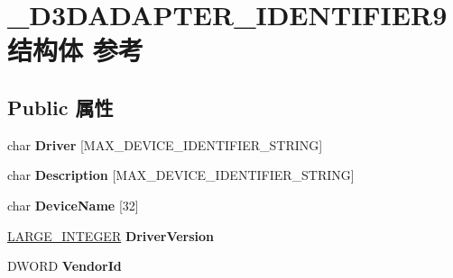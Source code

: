 \hypertarget{struct___d3_d_a_d_a_p_t_e_r___i_d_e_n_t_i_f_i_e_r9}{}\section{\+\_\+\+D3\+D\+A\+D\+A\+P\+T\+E\+R\+\_\+\+I\+D\+E\+N\+T\+I\+F\+I\+E\+R9结构体 参考}
\label{struct___d3_d_a_d_a_p_t_e_r___i_d_e_n_t_i_f_i_e_r9}
\subsection*{Public 属性}
\begin{DoxyCompactItemize}
\item 
\mbox{\label{struct___d3_d_a_d_a_p_t_e_r___i_d_e_n_t_i_f_i_e_r9_a0b2e04f006e57a26098d703c1123779a}} 
char {\bfseries Driver} \mbox{[}M\+A\+X\+\_\+\+D\+E\+V\+I\+C\+E\+\_\+\+I\+D\+E\+N\+T\+I\+F\+I\+E\+R\+\_\+\+S\+T\+R\+I\+NG\mbox{]}
\item 
\mbox{\label{struct___d3_d_a_d_a_p_t_e_r___i_d_e_n_t_i_f_i_e_r9_a2cee146da64b0e004ba6ea1ce14b9b6e}} 
char {\bfseries Description} \mbox{[}M\+A\+X\+\_\+\+D\+E\+V\+I\+C\+E\+\_\+\+I\+D\+E\+N\+T\+I\+F\+I\+E\+R\+\_\+\+S\+T\+R\+I\+NG\mbox{]}
\item 
\mbox{\label{struct___d3_d_a_d_a_p_t_e_r___i_d_e_n_t_i_f_i_e_r9_a0bc6e85a666b608876c1dcac1a17bf96}} 
char {\bfseries Device\+Name} \mbox{[}32\mbox{]}
\item 
\mbox{\label{struct___d3_d_a_d_a_p_t_e_r___i_d_e_n_t_i_f_i_e_r9_a99057cc3e00542810356ec88b073ed7f}} 
\hyperlink{union___l_a_r_g_e___i_n_t_e_g_e_r}{L\+A\+R\+G\+E\+\_\+\+I\+N\+T\+E\+G\+ER} {\bfseries Driver\+Version}
\item 
\mbox{\label{struct___d3_d_a_d_a_p_t_e_r___i_d_e_n_t_i_f_i_e_r9_ac0614fd6138e7141884344f6a515a2d3}} 
D\+W\+O\+RD {\bfseries Vendor\+Id}
\item 
\mbox{\label{struct___d3_d_a_d_a_p_t_e_r___i_d_e_n_t_i_f_i_e_r9_a5c3de3c06be04086ab1218d559b0791b}} 

\end{DoxyCompactItemize}

